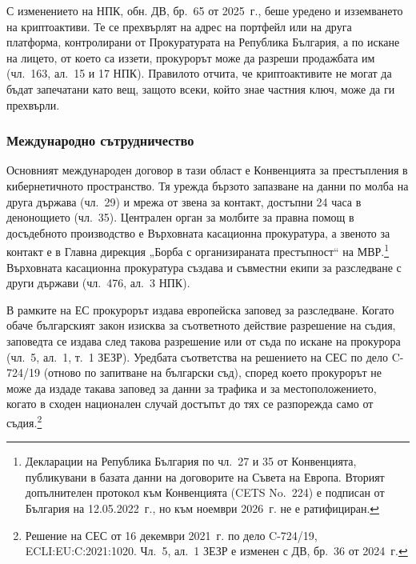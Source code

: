 С изменението на НПК, обн. ДВ, бр.~65 от 2025~г., беше уредено и изземването на
криптоактиви. Те се прехвърлят на адрес на портфейл или на друга платформа, контролирани
от Прокуратурата на Република България, а по искане на лицето, от което са иззети,
прокурорът може да разреши продажбата им (чл.~163, ал.~15 и 17 НПК). Правилото отчита,
че криптоактивите не могат да бъдат запечатани като вещ, защото всеки, който знае
частния ключ, може да ги прехвърли.

\subsubsection{Международно сътрудничество}

Основният международен договор в тази област е Конвенцията за престъпления в
кибернетичното пространство. Тя урежда бързото запазване на данни по молба на друга
държава (чл.~29) и мрежа от звена за контакт, достъпни 24 часа в денонощието (чл.~35).
Централен орган за молбите за правна помощ в досъдебното производство е Върховната
касационна прокуратура, а звеното за контакт е в Главна дирекция „Борба с организираната
престъпност“ на МВР.\footnote{Декларации на Република България по чл.~27 и 35 от
Конвенцията, публикувани в базата данни на договорите на Съвета на Европа. Вторият
допълнителен протокол към Конвенцията (CETS No.~224) е подписан от България на
12.05.2022~г., но към ноември 2026~г. не е ратифициран.} Върховната касационна
прокуратура създава и съвместни екипи за разследване с други държави (чл.~476, ал.~3 НПК).

В рамките на ЕС прокурорът издава европейска заповед за разследване. Когато обаче
българският закон изисква за съответното действие разрешение на съдия, заповедта се
издава след такова разрешение или от съда по искане на прокурора (чл.~5, ал.~1, т.~1
ЗЕЗР). Уредбата съответства на решението на СЕС по дело C-724/19 (отново по
запитване на български съд), според което прокурорът не може да издаде такава заповед за данни за
трафика и за местоположението, когато в сходен национален случай достъпът до тях се
разпорежда само от съдия.\footnote{Решение на СЕС от 16 декември 2021~г. по дело C-724/19,
ECLI:EU:C:2021:1020. Чл.~5, ал.~1 ЗЕЗР е изменен с ДВ, бр.~36 от 2024~г.}

